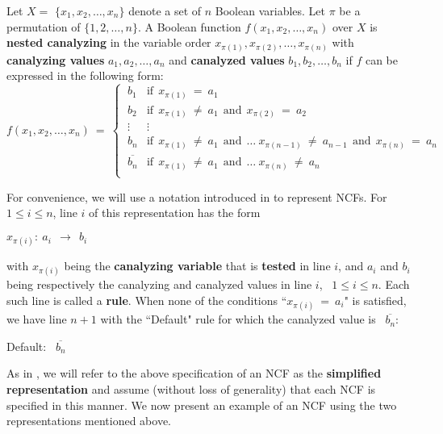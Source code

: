 \begin{definition}\label{def:nested_canalyzing}
Let $X = $ $\{x_1, x_2, \ldots, x_n\}$ denote a set of $n$  Boolean variables.
Let $\pi$ be a permutation of $\{1, 2, \ldots, n\}$.
A Boolean function $f(x_1, x_2, \ldots, x_n)$ over $X$ is \textbf{nested canalyzing}
in the variable order $x_{\pi(1)}, x_{\pi(2)}, \ldots, x_{\pi(n)}$ with
\textbf{canalyzing values} $a_1, a_2, \ldots, a_n$ and 
\textbf{canalyzed values} $b_1, b_2, \ldots, b_n$ 
if $f$ can be expressed in the following form:
\[
f(x_1, x_2, \ldots, x_n) ~=~ 
   \begin{cases}
       \:b_1 & \mathrm{if~~} x_{\pi(1)} ~=~ a_1 \\
       \:b_2 & \mathrm{if~~} x_{\pi(1)} ~\neq~ a_1 \mathrm{~~and~~}
            x_{\pi(2)} ~=~ a_2 \\
       \:\vdots & \vdots \\
       \:b_n & \mathrm{if~~} x_{\pi(1)} ~\neq~ a_1 \mathrm{~~and~~} \ldots~
             x_{\pi(n-1)} ~\neq~ a_{n-1} \mathrm{~~and~~} x_{\pi(n)} ~=~ a_n \\
       \:\overline{b_n} & \mathrm{if~~} x_{\pi(1)} ~\neq~ a_1 \mathrm{~~and~~} \ldots~
            x_{\pi(n)} ~\neq~ a_n \\
   \end{cases}
\]
\end{definition}
For convenience, we will use a notation introduced in \cite{Stearns-etal-2018}
to represent NCFs.
For $1 \leq i \leq n$, line $i$ of this representation has the form

\medskip

\noindent
\hspace*{1.1in} $x_{\pi(i)}:~ a_i ~~\longrightarrow~~ b_i$

\medskip

\noindent 
with $x_{\pi(i)}$ being the \textbf{canalyzing variable} that is
\textbf{tested} in line $i$, 
and $a_i$ and $b_i$ being respectively the canalyzing and 
canalyzed values in line $i$,~ $1 \leq i \leq n$.
Each such line is called a \textbf{rule}.
When none of the conditions ``$x_{\pi(i)} ~=~ a_i$" 
is satisfied, we have line $n+1$ with the ``Default" rule
for which the canalyzed value is~ $\overline{b_n}$: 

\medskip

\noindent
\hspace*{1.1in} Default:~ $\overline{b_n}$

\medskip
\noindent
As in \cite{Stearns-etal-2018}, we will refer to the above specification
of an NCF as the \textbf{simplified representation} and assume
(without loss of generality) that each NCF is specified in this manner.
We now present an example of an NCF using the two representations
mentioned above.


